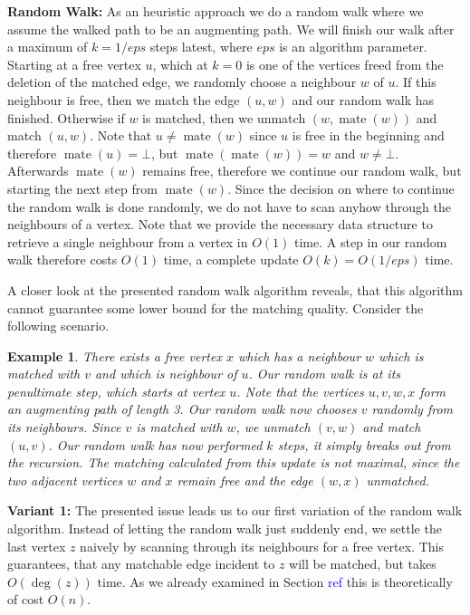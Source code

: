 \documentclass{article}      %
\newcommand\todo[1]{\textcolor{blue}{#1}}
\newtheorem{example}{Example}[subsection]
\DeclareMathOperator\mate{mate}
\begin{document}
\bigskip \noindent
\textbf{Random Walk:} As an heuristic approach we do a random walk where we assume the walked path to be an augmenting path. We will finish our walk after a maximum of $k=1/eps$ steps latest, where $eps$ is an algorithm parameter. Starting at a free vertex $u$, which at $k=0$ is one of the vertices freed from the deletion of the matched edge, we randomly choose a neighbour $w$ of $u$. If this neighbour is free, then we match the edge $(u,w)$ and our random walk has finished. Otherwise if $w$ is matched, then we unmatch $(w, \mate(w))$ and match $(u,w)$. Note that $u \neq \mate(w)$ since $u$ is free in the beginning and therefore $\mate(u) = \bot$, but $\mate(\mate(w)) = w$ and $w \neq \bot$. Afterwards $\mate(w)$ remains free, therefore we continue our random walk, but starting the next step from $\mate(w)$. Since the decision on where to continue the random walk is done randomly, we do not have to scan anyhow through the neighbours of a vertex. Note that we provide the necessary data structure to retrieve a single neighbour from a vertex in $O(1)$ time. A step in our random walk therefore costs $O(1)$ time, a complete update $O(k) = O(1/eps)$ time.

A closer look at the presented random walk algorithm reveals, that this algorithm cannot guarantee some lower bound for the matching quality. Consider the following scenario. 

\begin{example}
There exists a free vertex $x$ which has a neighbour $w$ which is matched with $v$ and which is neighbour of $u$. Our random walk is at its penultimate step, which starts at vertex $u$. Note that the vertices $u,v,w,x$ form an augmenting path of length 3. Our random walk now chooses $v$ randomly from its neighbours. Since $v$ is matched with $w$, we unmatch $(v,w)$ and match $(u,v)$. Our random walk has now performed $k$ steps, it simply breaks out from the recursion. The matching calculated from this update is not maximal, since the two adjacent vertices $w$ and $x$ remain free and the edge $(w,x)$ unmatched.
\end{example}

\noindent
\textbf{Variant 1:} The presented issue leads us to our first variation of the random walk algorithm. Instead of letting the random walk just suddenly end, we settle the last vertex $z$ naively by scanning through its neighbours for a free vertex. This guarantees, that any matchable edge incident to $z$ will be matched, but takes $O(\deg(z))$ time. As we already examined in Section \todo{ref} this is theoretically of cost $O(n)$.
\end{document}
